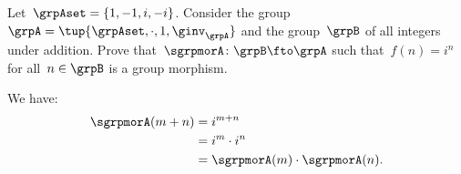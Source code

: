 \begin{exercise}
  Let~$\grpAset=\{1,-1,i,-i\}$. Consider the group~$\grpA=\tup{\grpAset, \cdot, 1, \ginv_\grpA}$ and the group~$\grpB$ of all integers under addition.
  Prove that~$\sgrpmorA\colon \grpB \fto \grpA$ such that~$f(n)=i^n$ for all~$n\in \grpB$ is a group morphism.
\end{exercise}
\begin{solution}
We have:
  \begin{equation*}
    \begin{aligned}
      \sgrpmorA(m+n)&=i^{m+n}\\
      &=i^m \cdot i^n\\
      &=\sgrpmorA(m)\cdot \sgrpmorA(n).
\end{aligned}
\end{equation*}
\end{solution}

